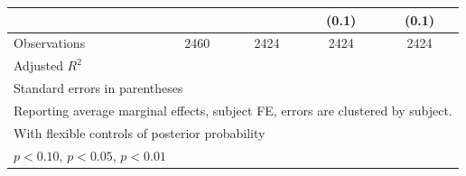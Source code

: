 \begin{table}[htbp]
\begin{tabular}{l*{4}{c}}
                &                  &                  &    (0.1)         &    (0.1)         \\
\hline
Observations    &     2460         &     2424         &     2424         &     2424         \\
Adjusted \(R^{2}\)&                  &                  &                  &                  \\
\hline\hline
\multicolumn{5}{l}{\footnotesize Standard errors in parentheses}\\
\multicolumn{5}{l}{\footnotesize Reporting average marginal effects, subject FE, errors are clustered by subject.}\\
\multicolumn{5}{l}{\footnotesize With flexible controls of posterior probability}\\
\multicolumn{5}{l}{\footnotesize \sym{*} \(p<0.10\), \sym{**} \(p<0.05\), \sym{***} \(p<0.01\)}\\
\end{tabular}
\end{table}

